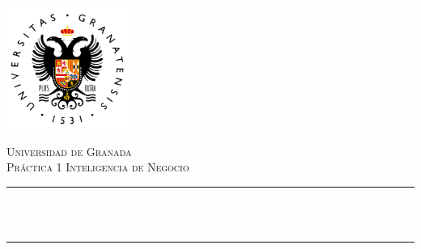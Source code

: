 \begin{titlepage}

\newcommand{\HRule}{\rule{\linewidth}{0.5mm}} %



\includegraphics[width = 4cm]{./figures/ugr}\\[0.5cm] 

\center %


\textsc{\Large Universidad de Granada}\\[0.5cm] 
\textsc{\large Práctica 1 Inteligencia de Negocio}\\[0.5cm] 


\HRule \\[0.4cm]
{ \huge \bfseries \reporttitle}\\ %
\HRule \\[1.5cm]
 

\begin{minipage}{0.4\textwidth}
\begin{flushleft} \large
\reportauthor %
\end{flushleft}
\end{minipage}
~


\vfill %
\degreetype\\[0.5cm]

\makeatletter
\@date 
\makeatother


\end{titlepage}
